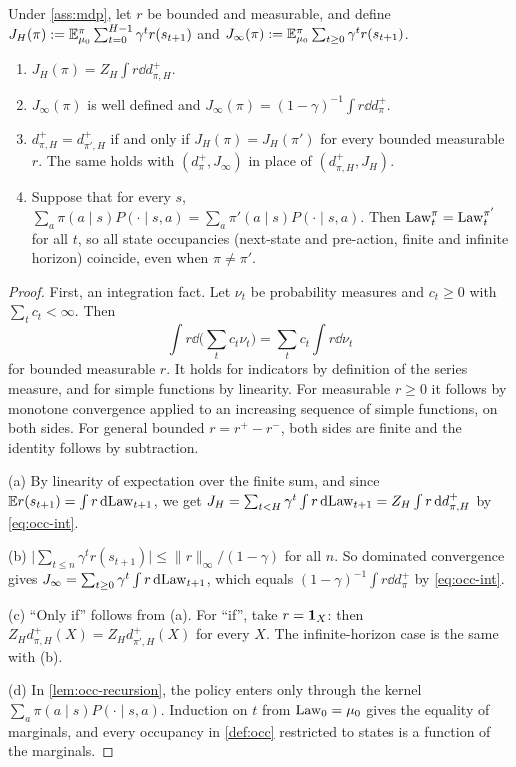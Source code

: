 \begin{proposition}\label{prop:occ-return}
Under \cref{ass:mdp}, let $r$ be bounded and measurable, and define
$J_H(\pi):=\mathbb{E}^\pi_{\mu_0}\sum_{t=0}^{H-1}\gamma^tr(s_{t+1})$ and
$J_\infty(\pi):=\mathbb{E}^\pi_{\mu_0}\sum_{t\ge0}\gamma^tr(s_{t+1})$.
\begin{enumerate}[nosep,label=(\alph*)]
\item $J_H(\pi)=Z_H\int r\dd d^+_{\pi,H}$.
\item $J_\infty(\pi)$ is well defined and $J_\infty(\pi)=(1-\gamma)^{-1}\int r\dd d^+_\pi$.
\item $d^+_{\pi,H}=d^+_{\pi',H}$ if and only if $J_H(\pi)=J_H(\pi')$ for every bounded measurable $r$.
  The same holds with $(d^+_\pi,J_\infty)$ in place of $(d^+_{\pi,H},J_H)$.
\item Suppose that for every $s$, $\sum_a\pi(a\mid s)P(\cdot\mid s,a)=\sum_a\pi'(a\mid s)P(\cdot\mid s,a)$.
  Then $\mathrm{Law}^\pi_t=\mathrm{Law}^{\pi'}_t$ for all $t$, so all state occupancies (next-state and pre-action, finite and infinite horizon) coincide, even when $\pi\ne\pi'$.
\end{enumerate}
\end{proposition}
\begin{proof}
First, an integration fact. Let $\nu_t$ be probability measures and $c_t\ge0$ with $\sum_tc_t<\infty$. Then
\begin{equation}\label{eq:occ-int}
\int r\dd\Big(\sum_tc_t\nu_t\Big)=\sum_tc_t\int r\dd\nu_t
\end{equation}
for bounded measurable $r$. It holds for indicators by definition of the series measure, and for simple functions by linearity.
For measurable $r\ge0$ it follows by monotone convergence applied to an increasing sequence of simple functions, on both sides.
For general bounded $r=r^+-r^-$, both sides are finite and the identity follows by subtraction.

(a) By linearity of expectation over the finite sum, and since $\mathbb{E} r(s_{t+1})=\int r\,\mathrm{d}\mathrm{Law}_{t+1}$, we get $J_H=\sum_{t<H}\gamma^t\int r\,\mathrm{d}\mathrm{Law}_{t+1}=Z_H\int r\,\mathrm{d} d^+_{\pi,H}$ by \eqref{eq:occ-int}.

(b) $\big|\sum_{t\le n}\gamma^tr(s_{t+1})\big|\le\|r\|_\infty/(1-\gamma)$ for all $n$.
So dominated convergence gives $J_\infty=\sum_{t\ge0}\gamma^t\int r\,\mathrm{d}\mathrm{Law}_{t+1}$, which equals $(1-\gamma)^{-1}\int r\dd d^+_\pi$ by \eqref{eq:occ-int}.

(c) ``Only if'' follows from (a). For ``if'', take $r=\mathbf{1}_X$: then $Z_Hd^+_{\pi,H}(X)=Z_Hd^+_{\pi',H}(X)$ for every $X$. The infinite-horizon case is the same with (b).

(d) In \cref{lem:occ-recursion}, the policy enters only through the kernel $\sum_a\pi(a\mid s)P(\cdot\mid s,a)$.
Induction on $t$ from $\mathrm{Law}_0=\mu_0$ gives the equality of marginals, and every occupancy in \cref{def:occ} restricted to states is a function of the marginals.
\end{proof}


